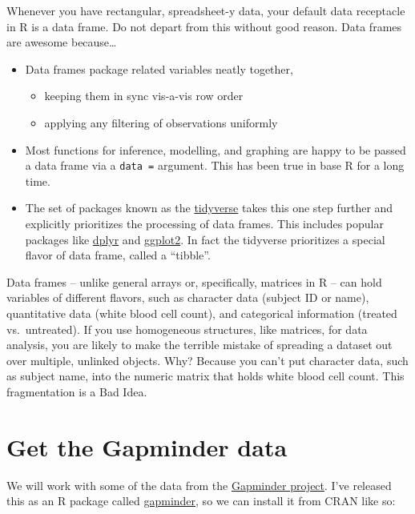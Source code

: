 \documentclass[
]{book}
\providecommand{\tightlist}{%
  \setlength{\itemsep}{0pt}\setlength{\parskip}{0pt}}
\begin{document}
Whenever you have rectangular, spreadsheet-y data, your default data receptacle in R is a data frame. Do not depart from this without good reason. Data frames are awesome because\ldots{}

\begin{itemize}
\tightlist
\item
  Data frames package related variables neatly together,

  \begin{itemize}
  \tightlist
  \item
    keeping them in sync vis-a-vis row order
  \item
    applying any filtering of observations uniformly
  \end{itemize}
\item
  Most functions for inference, modelling, and graphing are happy to be passed a data frame via a \texttt{data\ =} argument. This has been true in base R for a long time.
\item
  The set of packages known as the \href{https://tidyverse.tidyverse.org}{tidyverse} takes this one step further and explicitly prioritizes the processing of data frames. This includes popular packages like \href{https://dplyr.tidyverse.org}{dplyr} and \href{https://ggplot2.tidyverse.org}{ggplot2}. In fact the tidyverse prioritizes a special flavor of data frame, called a ``tibble''.
\end{itemize}

Data frames -- unlike general arrays or, specifically, matrices in R -- can hold variables of different flavors, such as character data (subject ID or name), quantitative data (white blood cell count), and categorical information (treated vs.~untreated). If you use homogeneous structures, like matrices, for data analysis, you are likely to make the terrible mistake of spreading a dataset out over multiple, unlinked objects. Why? Because you can't put character data, such as subject name, into the numeric matrix that holds white blood cell count. This fragmentation is a Bad Idea.

\hypertarget{get-the-gapminder-data}{%
\section{Get the Gapminder data}\label{get-the-gapminder-data}}

We will work with some of the data from the \href{https://www.gapminder.org}{Gapminder project}. I've released this as an R package called \href{https://github.com/jennybc/gapminder}{gapminder}, so we can install it from CRAN like so:
\end{document}
